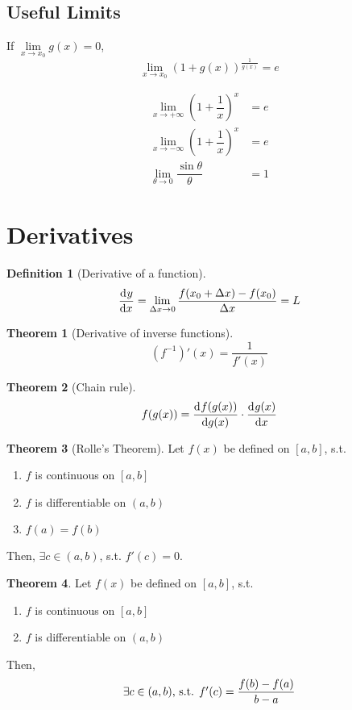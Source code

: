 \documentclass[fleqn, a5paper, 11pt]{article}
\theoremstyle{definition}
\newtheorem{definition}{Definition}
\theoremstyle{theorem}
\newtheorem{theorem}{Theorem}
\theoremstyle{remark}
\begin{document}
\subsection{Useful Limits}

If $\lim\limits_{x \rightarrow x_0} g(x) = 0$, 
\begin{equation*}
	\lim\limits_{x \rightarrow x_0} (1 + g(x))^{\frac{1}{g(x)}} = e
\end{equation*}

\begin{align*}
	\lim\limits_{x \rightarrow +\infty} \left(1 + \dfrac{1}{x}\right) ^x &= e\\
	\lim\limits_{x \rightarrow -\infty} \left(1 + \dfrac{1}{x}\right) ^x &= e\\
	\lim\limits_{\theta \rightarrow 0} \dfrac{\sin \theta}{\theta} &= 1
\end{align*}

\section{Derivatives}

\begin{definition}[Derivative of a function]
	\begin{equation*}
		\dod{y}{x} = \lim\limits_{\Delta x \rightarrow 0} \dfrac{f(x_0 + \Delta x) - f(x_0)}{\Delta x} = L
	\end{equation*}
\end{definition}

\begin{theorem}[Derivative of inverse functions]
	\begin{equation*}
	(f^{-1})'(x) = \dfrac{1}{f'(x)}
	\end{equation*}
\end{theorem}

\begin{theorem}[Chain rule]
	\begin{equation*}
	f(g(x)) = \dod{f(g(x))}{g(x)} \cdot \dod{g(x)}{x}
	\end{equation*}
\end{theorem}

\begin{theorem}[Rolle's Theorem]
	Let $f(x)$ be defined on $[a, b]$, s.t. 
	\begin{enumerate}
		\item $f$ is continuous on $[a, b]$ \label{Rolle condition 1}
		\item $f$ is differentiable on $(a, b)$ \label{Rolle condition 2}
		\item $f(a) = f(b)$ \label{Rolle condition 3}
	\end{enumerate}
	Then, $\exists c \in (a, b)$, s.t. $f'(c) = 0$.
\end{theorem}


\begin{theorem}
	Let $f(x)$ be defined on $[a, b]$, s.t. 
	\begin{enumerate}
		\item $f$ is continuous on $[a, b]$
		\item $f$ is differentiable on $(a, b)$
	\end{enumerate}
	Then, 
	\begin{equation*}
		\exists c \in (a, b)$, s.t. $f'(c) = \dfrac{f(b) - f(a)}{b - a}
	\end{equation*}
\end{theorem}
\end{document}

